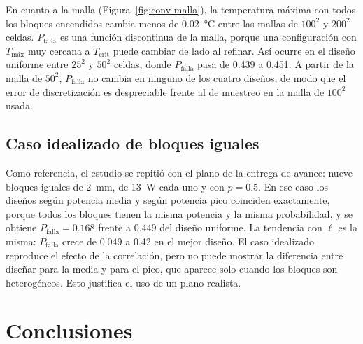 \documentclass[preprint,11pt,sort&compress]{elsarticle}
\newcommand{\Pf}{P_{\mathrm{falla}}}
\newcommand{\Tc}{T_{\mathrm{crit}}}
\newcommand{\Tmax}{T_{\mathrm{máx}}}
\begin{document}
En cuanto a la malla (Figura~\ref{fig:conv-malla}), la temperatura máxima con todos los
bloques encendidos cambia menos de \SI{0.02}{\celsius} entre las mallas de $100^2$ y $200^2$
celdas. $\Pf$ es una función discontinua de la malla, porque una configuración con $\Tmax$
muy cercana a $\Tc$ puede cambiar de lado al refinar. Así ocurre en el diseño uniforme entre
$25^2$ y $50^2$ celdas, donde $\Pf$ pasa de \num{0.439} a \num{0.451}. A partir de la malla
de $50^2$, $\Pf$ no cambia en ninguno de los cuatro diseños, de modo que el error de
discretización es despreciable frente al de muestreo en la malla de $100^2$ usada.

\subsection{Caso idealizado de bloques iguales}

Como referencia, el estudio se repitió con el plano de la entrega de avance: nueve bloques
iguales de \SI{2}{\milli\metre}, de \SI{13}{\watt} cada uno y con $p=\num{0.5}$. En ese caso
los diseños según potencia media y según potencia pico coinciden exactamente, porque todos
los bloques tienen la misma potencia y la misma probabilidad, y se obtiene
$\Pf=\num{0.168}$ frente a \num{0.449} del diseño uniforme. La tendencia con $\ell$ es la
misma: $\Pf$ crece de \num{0.049} a \num{0.42} en el mejor diseño. El caso idealizado
reproduce el efecto de la correlación, pero no puede mostrar la diferencia entre diseñar
para la media y para el pico, que aparece solo cuando los bloques son heterogéneos. Esto
justifica el uso de un plano realista.

\section{Conclusiones}
\label{sec:conclusiones}
\end{document}
